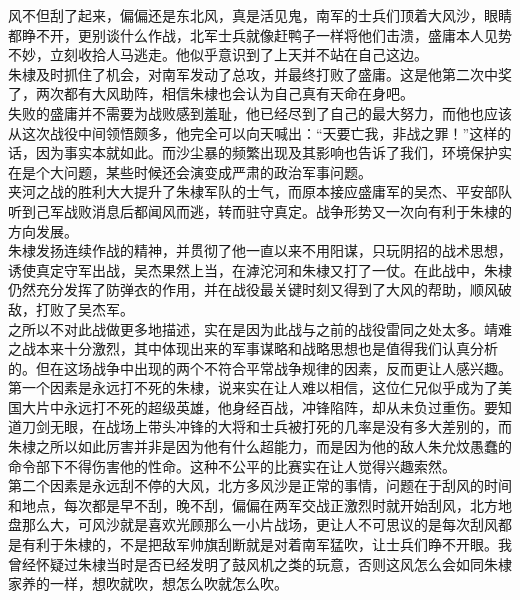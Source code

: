 \begin{multicols}{\theparacolNo}
风不但刮了起来，偏偏还是东北风，真是活见鬼，南军的士兵们顶着大风沙，眼睛都睁不开，更别谈什么作战，北军士兵就像赶鸭子一样将他们击溃，盛庸本人见势不妙，立刻收拾人马逃走。他似乎意识到了上天并不站在自己这边。\\

朱棣及时抓住了机会，对南军发动了总攻，并最终打败了盛庸。这是他第二次中奖了，两次都有大风助阵，相信朱棣也会认为自己真有天命在身吧。\\

失败的盛庸并不需要为战败感到羞耻，他已经尽到了自己的最大努力，而他也应该从这次战役中间领悟颇多，他完全可以向天喊出：“天要亡我，非战之罪！”这样的话，因为事实本就如此。而沙尘暴的频繁出现及其影响也告诉了我们，环境保护实在是个大问题，某些时候还会演变成严肃的政治军事问题。\\

夹河之战的胜利大大提升了朱棣军队的士气，而原本接应盛庸军的吴杰、平安部队听到己军战败消息后都闻风而逃，转而驻守真定。战争形势又一次向有利于朱棣的方向发展。\\

朱棣发扬连续作战的精神，并贯彻了他一直以来不用阳谋，只玩阴招的战术思想，诱使真定守军出战，吴杰果然上当，在滹沱河和朱棣又打了一仗。在此战中，朱棣仍然充分发挥了防弹衣的作用，并在战役最关键时刻又得到了大风的帮助，顺风破敌，打败了吴杰军。\\

之所以不对此战做更多地描述，实在是因为此战与之前的战役雷同之处太多。靖难之战本来十分激烈，其中体现出来的军事谋略和战略思想也是值得我们认真分析的。但在这场战争中出现的两个不符合平常战争规律的因素，反而更让人感兴趣。\\

第一个因素是永远打不死的朱棣，说来实在让人难以相信，这位仁兄似乎成为了美国大片中永远打不死的超级英雄，他身经百战，冲锋陷阵，却从未负过重伤。要知道刀剑无眼，在战场上带头冲锋的大将和士兵被打死的几率是没有多大差别的，而朱棣之所以如此厉害并非是因为他有什么超能力，而是因为他的敌人朱允炆愚蠢的命令部下不得伤害他的性命。这种不公平的比赛实在让人觉得兴趣索然。\\

第二个因素是永远刮不停的大风，北方多风沙是正常的事情，问题在于刮风的时间和地点，每次都是早不刮，晚不刮，偏偏在两军交战正激烈时就开始刮风，北方地盘那么大，可风沙就是喜欢光顾那么一小片战场，更让人不可思议的是每次刮风都是有利于朱棣的，不是把敌军帅旗刮断就是对着南军猛吹，让士兵们睁不开眼。我曾经怀疑过朱棣当时是否已经发明了鼓风机之类的玩意，否则这风怎么会如同朱棣家养的一样，想吹就吹，想怎么吹就怎么吹。\\


\end{multicols}
